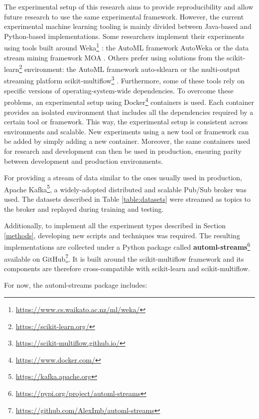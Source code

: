 \documentclass{sig-alternate-br}
\begin{document}
The experimental setup of this research aims to provide reproducibility and allow future research to use the same experimental framework. However, the current experimental machine learning tooling is mainly divided between Java-based and Python-based implementations. Some researchers implement their experiments using tools built around Weka\footnote{\url{https://www.cs.waikato.ac.nz/ml/weka/}} \cite{holmes1994weka}: the AutoML framework AutoWeka \cite{thornton2013autoweka} or the data stream mining framework MOA \cite{bifet2010moa}. Others prefer using solutions from the scikit-learn\footnote{\url{https://scikit-learn.org/}} environment: the AutoML framework auto-sklearn \cite{feurer2015autosklearn} or the multi-output streaming platform scikit-multiflow\footnote{\url{https://scikit-multiflow.github.io/}} \cite{montiel2018scikit}. Furthermore, some of these tools rely on specific versions of operating-system-wide dependencies. To overcome these problems, an experimental setup using Docker\footnote{\url{https://www.docker.com/}} containers is used. Each container provides an isolated environment that includes all the dependencies required by a certain tool or framework. This way, the experimental setup is consistent across environments and scalable. New experiments using a new tool or framework can be added by simply adding a new container. Moreover, the same containers used for research and development can then be used in production, ensuring parity between development and production environments.

For providing a stream of data similar to the ones usually used in production, Apache Kafka\footnote{\url{https://kafka.apache.org}}, a widely-adopted distributed and scalable \cite{kreps2011kafka} Pub/Sub broker was used. The datasets described in Table \ref{table:datasets} were streamed as topics to the broker and replayed during training and testing. 

Additionally, to implement all the experiment types described in Section \ref{methods}, developing new scripts and techniques was required. The resulting implementations are collected under a Python package called \textbf{automl-streams}\footnote{\url{https://pypi.org/project/automl-streams}} available on GitHub\footnote{\url{https://github.com/AlexImb/automl-streams}}. It is built around the scikit-multiflow framework and its components are therefore cross-compatible with scikit-learn and scikit-multiflow.

For now, the automl-streams package includes:
\end{document}
